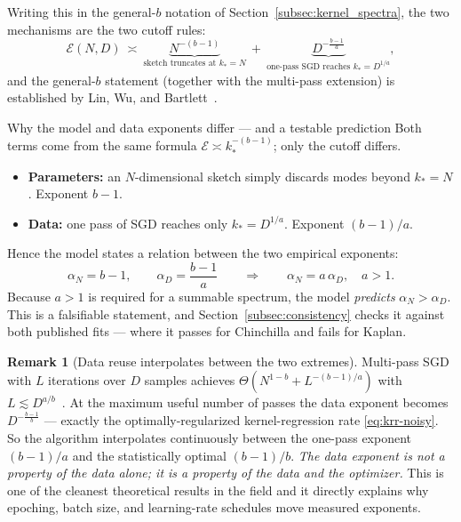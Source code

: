 \documentclass[11pt,a4paper]{article}
\theoremstyle{definition}
\newtheorem{remark}{Remark}[section]
\begin{document}
Writing this in the general-$b$ notation of Section~\ref{subsec:kernel_spectra}, the two mechanisms are the two cutoff rules:
\begin{equation}
  \mathcal{E}(N,D)\ \asymp\ \underbrace{N^{-(b-1)}}_{\text{sketch truncates at } k_*=N} \ +\ \underbrace{D^{-\frac{b-1}{a}}}_{\text{one-pass SGD reaches } k_*=D^{1/a}} ,
\end{equation}
and the general-$b$ statement (together with the multi-pass extension) is established by Lin, Wu, and Bartlett~\cite{lin2025reuse}.

\begin{intuition}{Why the model and data exponents differ --- and a testable prediction}
Both terms come from the same formula $\mathcal{E}\asymp k_*^{-(b-1)}$; only the cutoff differs.
\begin{itemize}[leftmargin=1.5em,nosep]
  \item \textbf{Parameters:} an $N$-dimensional sketch simply discards modes beyond $k_*=N$. Exponent $b-1$.
  \item \textbf{Data:} one pass of SGD reaches only $k_*=D^{1/a}$. Exponent $(b-1)/a$.
\end{itemize}
Hence the model states a relation between the two empirical exponents:
\[ \alpha_N = b-1, \qquad \alpha_D = \frac{b-1}{a} \qquad\Longrightarrow\qquad \boxed{\alpha_N = a\,\alpha_D}, \quad a>1 . \]
Because $a>1$ is required for a summable spectrum, the model \emph{predicts} $\alpha_N > \alpha_D$. This is a falsifiable statement, and Section~\ref{subsec:consistency} checks it against both published fits --- where it passes for Chinchilla and fails for Kaplan.
\end{intuition}

\begin{remark}[Data reuse interpolates between the two extremes]
Multi-pass SGD with $L$ iterations over $D$ samples achieves $\Theta(N^{1-b} + L^{-(b-1)/a})$ with $L\lesssim D^{a/b}$~\cite{lin2025reuse}. At the maximum useful number of passes the data exponent becomes $D^{-\frac{b-1}{b}}$ --- exactly the optimally-regularized kernel-regression rate \eqref{eq:krr-noisy}. So the algorithm interpolates continuously between the one-pass exponent $(b-1)/a$ and the statistically optimal $(b-1)/b$. \emph{The data exponent is not a property of the data alone; it is a property of the data and the optimizer.} This is one of the cleanest theoretical results in the field and it directly explains why epoching, batch size, and learning-rate schedules move measured exponents.
\end{remark}
\end{document}
